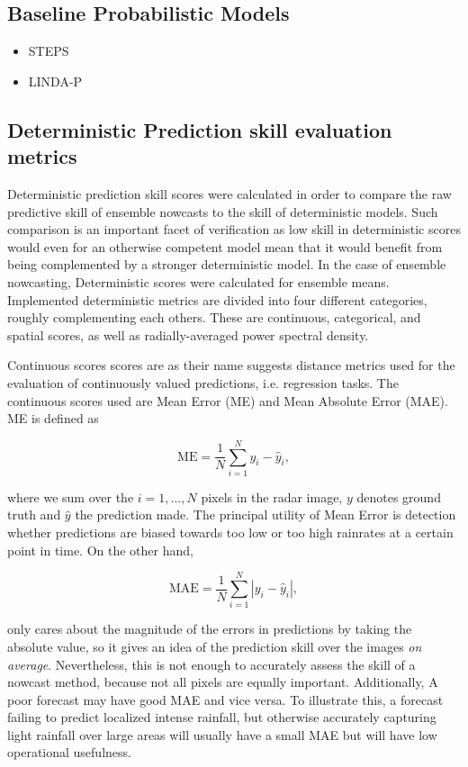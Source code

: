 \subsection{Baseline Probabilistic Models}

\begin{itemize}
	\item STEPS
	\item LINDA-P
\end{itemize}

\subsection{Deterministic Prediction skill evaluation metrics}

Deterministic prediction skill scores were calculated in order to compare the raw predictive skill of ensemble nowcasts to the skill of deterministic models. Such comparison is an important facet of verification as low skill in deterministic scores would even for an otherwise competent model mean that it would benefit from being complemented by a stronger deterministic model. In the case of ensemble nowcasting, Deterministic scores were calculated for ensemble means. Implemented deterministic metrics are divided into four different categories, roughly complementing each others. These are continuous, categorical, and spatial scores, as well as radially-averaged power spectral density.  

Continuous scores scores are as their name suggests distance metrics used for the evaluation of continuously valued predictions, i.e. regression tasks. The continuous scores used are Mean Error (ME) and Mean Absolute Error (MAE). ME is defined as 

\begin{equation}
	\text{ME} = \frac{1}{N}\sum_{i=1}^{N} y_i - \hat{y}_i,
\end{equation}

where we sum over the $i=1,\dots,N$ pixels in the radar image, $y$ denotes ground truth and $\hat{y}$ the prediction made. The principal utility of Mean Error is detection whether predictions are biased towards too low or too high rainrates at a certain point in time. On the other hand, 

\begin{equation}
	\text{MAE} = \frac{1}{N}\sum_{i=1}^{N} |y_i - \hat{y}_i|,
\end{equation}

only cares about the magnitude of the errors in predictions by taking the absolute value, so it gives an idea of the prediction skill over the images \textit{on average}. Nevertheless, this is not enough to accurately assess the skill of a nowcast method, because not all pixels are equally important. Additionally, A poor forecast may have good MAE and vice versa. To illustrate this, a forecast failing to predict localized intense rainfall, but otherwise accurately capturing light rainfall over large areas will usually have a small MAE but will have low operational usefulness.

